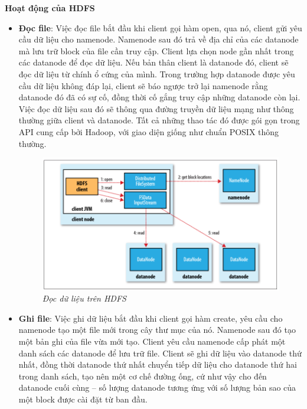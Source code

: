 \documentclass[12pt]{report}
\begin{document}
\textbf{Hoạt động của HDFS}
\begin{itemize}
\item \textbf{Đọc file}: Việc đọc file bắt đầu khi client gọi hàm open, qua nó, client gửi yêu cầu dữ liệu cho namenode. Namenode sau đó trả về địa chỉ của các datanode mà lưu trữ block của file cần truy cập. Client lựa chọn node gần nhất trong các datanode để đọc dữ liệu. Nếu bản thân client là datanode đó, client sẽ đọc dữ liệu từ chính ổ cứng của mình. Trong trường hợp datanode được yêu cầu dữ liệu không đáp lại, client sẽ báo ngược trở lại namenode rằng datanode đó đã có sự cố, đồng thời cố gắng truy cập những datanode còn lại. Việc đọc dữ liệu sau đó sẽ thông qua đường truyền dữ liệu mạng như thông thường giữa client và datanode. Tất cả những thao tác đó được gói gọn trong API cung cấp bởi Hadoop, với giao diện giống như chuẩn POSIX thông thường.

\begin{figure}[H]
\centering
\includegraphics[width=\textwidth]{read.png}
\caption{\it Đọc dữ liệu trên HDFS \cite{read}}
\end{figure}

\item \textbf{Ghi file}: Việc ghi dữ liệu bắt đầu khi client gọi hàm create, yêu cầu cho namenode tạo một file mới trong cây thư mục của nó. Namenode sau đó tạo  một bản ghi của file vừa mới tạo. Client yêu cầu namenode cấp phát một danh sách các datanode để lưu trữ file. Client sẽ ghi dữ liệu vào datanode thứ nhất, đồng thời datanode thứ nhất chuyển tiếp dữ liệu cho datanode thứ hai trong danh sách, tạo nên một cơ chế đường ống, cứ như vậy cho đến datanode cuối cùng – số lượng datanode tương ứng với số lượng bản sao của một block được cài đặt từ ban đầu.


\end{itemize}
\end{document}
